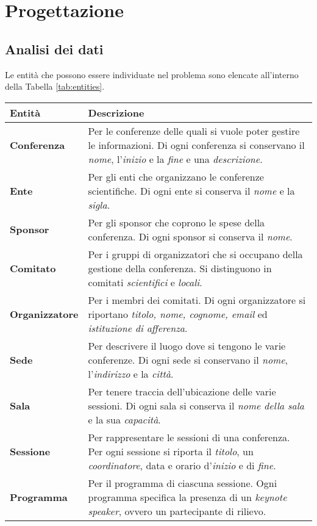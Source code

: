 \chapter{Progettazione}
\section{Analisi dei dati}
Le entità che possono essere individuate nel problema sono elencate all'interno della Tabella \ref{tab:entities}.
\begin{table}[h!]
\begin{tabularx}{\textwidth}{|l|X|}
\hline
\textbf{Entità} & \textbf{Descrizione} \\
\hline
\textbf{Conferenza} & Per le conferenze delle quali si vuole poter gestire le informazioni. Di ogni conferenza si conservano il \textit{nome}, l'\textit{inizio} e la \textit{fine} e una \textit{descrizione}. \\ \hline
\textbf{Ente} & Per gli enti che organizzano le conferenze scientifiche. Di ogni ente si conserva il \textit{nome} e la \textit{sigla}. \\ \hline
\textbf{Sponsor} & Per gli sponsor che coprono le spese della conferenza. Di ogni sponsor si conserva il \textit{nome}.\\ \hline
\textbf{Comitato} & Per i gruppi di organizzatori che si occupano della gestione della conferenza. Si distinguono in comitati \textit{scientifici} e \textit{locali}. \\ \hline
\textbf{Organizzatore} & Per i membri dei comitati. Di ogni organizzatore si riportano \textit{titolo, nome, cognome, email} ed \textit{istituzione di afferenza}. \\ \hline
\textbf{Sede} & Per descrivere il luogo dove si tengono le varie conferenze. Di ogni sede si conservano il \textit{nome}, l'\textit{indirizzo} e la \textit{città}.\\ \hline
\textbf{Sala} & Per tenere traccia dell'ubicazione delle varie sessioni. Di ogni sala si conserva il \textit{nome della sala} e la sua \textit{capacità}. \\ \hline
\textbf{Sessione} & Per rappresentare le sessioni di una conferenza. Per ogni sessione si riporta il \textit{titolo}, un \textit{coordinatore}, data e orario d'\textit{inizio} e di \textit{fine}. \\ \hline
\textbf{Programma} & Per il programma di ciascuna sessione. Ogni programma specifica la presenza di un \textit{keynote speaker}, ovvero un partecipante di rilievo. \\ \hline

\end{tabularx}
\end{table}
